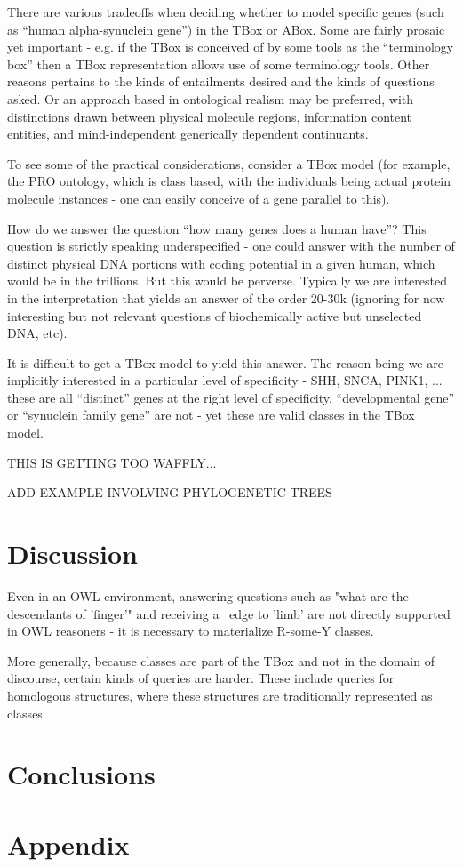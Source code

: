 \documentclass{my}
\def\partOf{\pr{part\_of}}
\begin{document}
There are various tradeoffs when deciding whether to model specific
genes (such as ``human alpha-synuclein gene'') in the TBox or
ABox. Some are fairly prosaic yet important - e.g. if the TBox is
conceived of by some tools as the ``terminology box'' then a TBox
representation allows use of some terminology tools. Other reasons
pertains to the kinds of entailments desired and the kinds of
questions asked. Or an approach based in ontological realism may be
preferred, with distinctions drawn between physical molecule regions,
information content entities, and mind-independent generically
dependent continuants.

To see some of the practical considerations, consider a TBox model
(for example, the PRO ontology, which is class based, with the
individuals being actual protein molecule instances - one can easily
conceive of a gene parallel to this).

How do we answer the question ``how many genes does a human have''?
This question is strictly speaking underspecified - one could answer
with the number of distinct physical DNA portions with coding
potential in a given human, which would be in the trillions. But this
would be perverse. Typically we are interested in the interpretation
that yields an answer of the order 20-30k (ignoring for now
interesting but not relevant questions of biochemically active but
unselected DNA, etc).

It is difficult to get a TBox model to yield this answer. The reason
being we are implicitly interested in a particular level of
specificity - SHH, SNCA, PINK1, ... these are all ``distinct'' genes
at the right level of specificity. ``developmental gene'' or
``synuclein family gene'' are not - yet these are valid classes in the
TBox model.

THIS IS GETTING TOO WAFFLY...

ADD EXAMPLE INVOLVING PHYLOGENETIC TREES

\section{Discussion}

Even in an OWL environment, answering questions such as "what are the descendants of 'finger'" and
receiving a \partOf\ edge to 'limb' are not directly supported in OWL reasoners - it is necessary to
materialize R-some-Y classes.

More generally, because classes are part of the TBox and not in the domain of discourse, certain
kinds of queries are harder. These include queries for homologous structures, where these structures
are traditionally represented as classes.


\section{Conclusions}






\newpage
\section*{Appendix}
\end{document}

